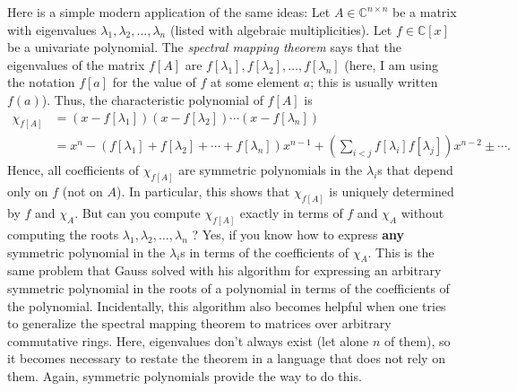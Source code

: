 Here is a simple modern application of the same ideas: Let $A\in
\mathbb{C}^{n\times n}$ be a matrix with eigenvalues $\lambda_{1},\lambda
_{2},\ldots,\lambda_{n}$ (listed with algebraic multiplicities). Let
$f\in\mathbb{C}\left[  x\right]  $ be a univariate polynomial. The
\emph{spectral mapping theorem} says that the eigenvalues of the matrix
$f\left[  A\right]  $ are $f\left[  \lambda_{1}\right]  ,f\left[  \lambda
_{2}\right]  ,\ldots,f\left[  \lambda_{n}\right]  $ (here, I am using the
notation $f\left[  a\right]  $ for the value of $f$ at some element $a$; this
is usually written $f\left(  a\right)  $). Thus, the characteristic polynomial
of $f\left[  A\right]  $ is
\begin{align*}
\chi_{f\left[  A\right]  }  &  =\left(  x-f\left[  \lambda_{1}\right]
\right)  \left(  x-f\left[  \lambda_{2}\right]  \right)  \cdots\left(
x-f\left[  \lambda_{n}\right]  \right) \\
&  =x^{n}-\left(  f\left[  \lambda_{1}\right]  +f\left[  \lambda_{2}\right]
+\cdots+f\left[  \lambda_{n}\right]  \right)  x^{n-1}+\left(  \sum
_{i<j}f\left[  \lambda_{i}\right]  f\left[  \lambda_{j}\right]  \right)
x^{n-2}\pm\cdots.
\end{align*}
Hence, all coefficients of $\chi_{f\left[  A\right]  }$ are symmetric
polynomials in the $\lambda_{i}$s that depend only on $f$ (not on $A$). In
particular, this shows that $\chi_{f\left[  A\right]  }$ is uniquely
determined by $f$ and $\chi_{A}$. But can you compute $\chi_{f\left[
A\right]  }$ exactly in terms of $f$ and $\chi_{A}$ without computing the
roots $\lambda_{1},\lambda_{2},\ldots,\lambda_{n}$ ? Yes, if you know how to
express \textbf{any} symmetric polynomial in the $\lambda_{i}$s in terms of
the coefficients of $\chi_{A}$. This is the same problem that Gauss solved
with his algorithm for expressing an arbitrary symmetric polynomial in the
roots of a polynomial in terms of the coefficients of the polynomial.
Incidentally, this algorithm also becomes helpful when one tries to generalize
the spectral mapping theorem to matrices over arbitrary commutative rings.
Here, eigenvalues don't always exist (let alone $n$ of them), so it becomes
necessary to restate the theorem in a language that does not rely on them.
Again, symmetric polynomials provide the way to do this.
